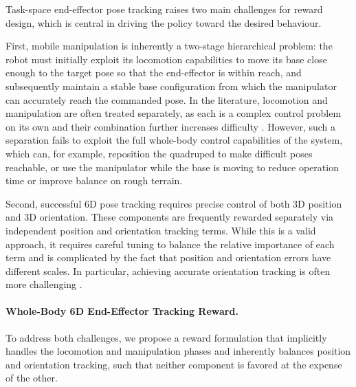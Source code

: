 Task-space end-effector pose tracking raises two main challenges for reward design, which is central in driving the policy toward the desired behaviour.

First, mobile manipulation is inherently a two-stage hierarchical problem: the robot must initially exploit its locomotion capabilities to move its base close enough to the target pose so that the end-effector is within reach, and subsequently maintain a stable base configuration from which the manipulator can accurately reach the commanded pose. In the literature, locomotion and manipulation are often treated separately, as each is a complex control problem on its own and their combination further increases difficulty \citep{fu2022deep, portela2025wholebodyendeffectorposetracking}. However, such a separation fails to exploit the full whole-body control capabilities of the system, which can, for example, reposition the quadruped to make difficult poses reachable, or use the manipulator while the base is moving to reduce operation time or improve balance on rough terrain.

Second, successful 6D pose tracking requires precise control of both 3D position and 3D orientation. These components are frequently rewarded separately via independent position and orientation tracking terms. While this is a valid approach, it requires careful tuning to balance the relative importance of each term and is complicated by the fact that position and orientation errors have different scales. In particular, achieving accurate orientation tracking is often more challenging \citep{portela2025wholebodyendeffectorposetracking}.

\paragraph{Whole-Body 6D End-Effector Tracking Reward.}

To address both challenges, we propose a reward formulation that implicitly handles the locomotion and manipulation phases and inherently balances position and orientation tracking, such that neither component is favored at the expense of the other.

